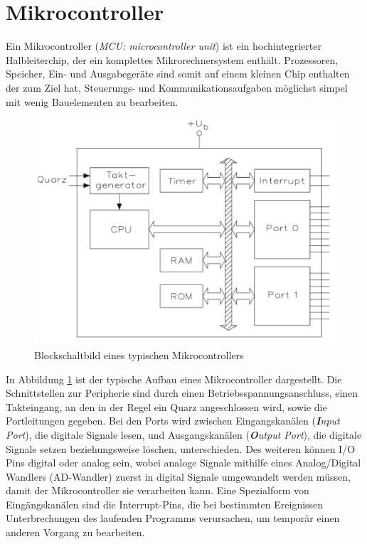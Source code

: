 \section{Mikrocontroller}
Ein Mikrocontroller (\textit{MCU: microcontroller unit}) ist ein hochintegrierter Halbleiterchip, der ein komplettes Mikrorechnersystem enthält. Prozessoren, Speicher, Ein- und Ausgabegeräte sind somit auf einem kleinen Chip enthalten der zum Ziel hat, Steuerungs- und Kommunikationsaufgaben möglichst simpel mit wenig Bauelementen zu bearbeiten. 
\begin{figure}[h]
	\centering
		\includegraphics{Bilder/Blockschaltbild Mikrocontroller.pdf}
	\caption{Blockschaltbild eines typischen Mikrocontrollers \cite[S.3]{Bernstein2015}}
	\label{fig:Blockschaltbild Mikrocontroller}
\end{figure}

In Abbildung \ref{fig:Blockschaltbild Mikrocontroller} ist der typische Aufbau eines Mikrocontroller dargestellt. Die Schnittstellen zur Peripherie sind durch einen Betriebsspannungsanschluss, einen Takteingang, an den in der Regel ein Quarz angeschlossen wird, sowie die Portleitungen  gegeben. Bei den Ports wird zwischen Eingangskanälen (\textit{\textbf{I}nput Port}), die digitale Signale lesen, und Ausgangskanälen (\textit{\textbf{O}utput Port}), die digitale Signale setzen beziehungsweise löschen, unterschieden. Des weiteren können I/O Pins digital oder analog sein, wobei analoge Signale mithilfe eines Analog/Digital Wandlers (AD-Wandler) zuerst in digital Signale umgewandelt werden müssen, damit der Mikrocontroller sie verarbeiten kann.
Eine Spezialform von Eingängskanälen sind die Interrupt-Pins, die bei bestimmten Ereignissen Unterbrechungen des laufenden Programms verursachen, um temporär einen anderen Vorgang zu bearbeiten. 

